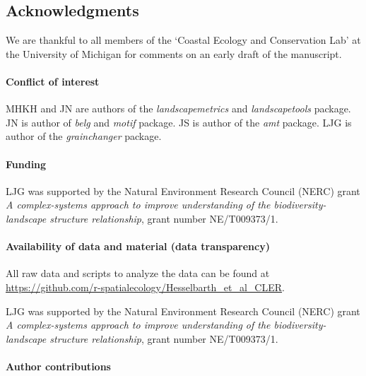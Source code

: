 \documentclass[smallextended]{svjour3}       %
\begin{document}
\FloatBarrier

\hypertarget{acknowledgments}{%
\subsection{Acknowledgments}\label{acknowledgments}}

We are thankful to all members of the `Coastal Ecology and Conservation Lab' at the University of Michigan for comments on an early draft of the manuscript.

\hypertarget{conflict-of-interest}{%
\paragraph{Conflict of interest}\label{conflict-of-interest}}

MHKH and JN are authors of the \emph{landscapemetrics} and \emph{landscapetools} package.
JN is author of \emph{belg} and \emph{motif} package. JS is author of the \emph{amt} package. LJG is author of the \emph{grainchanger} package.

\hypertarget{funding}{%
\paragraph{Funding}\label{funding}}

LJG was supported by the Natural Environment Research Council (NERC) grant \emph{A complex-systems approach to improve understanding of the biodiversity-landscape structure relationship}, grant number NE/T009373/1.

\hypertarget{availability-of-data-and-material-data-transparency}{%
\paragraph{Availability of data and material (data transparency)}\label{availability-of-data-and-material-data-transparency}}

All raw data and scripts to analyze the data can be found at \url{https://github.com/r-spatialecology/Hesselbarth_et_al_CLER}.

LJG was supported by the Natural Environment Research Council (NERC) grant \emph{A complex-systems approach to improve understanding of the biodiversity-landscape structure relationship}, grant number NE/T009373/1.

\hypertarget{author-contributions}{%
\paragraph{Author contributions}\label{author-contributions}}
\end{document}

